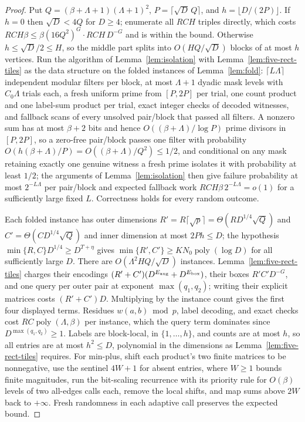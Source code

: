\documentclass[11pt]{article}
\begin{document}
\begin{proof}
Put $Q=(\beta+\Lambda+1)(\Lambda+1)^2$, $P=\lceil\sqrt D\,Q\rceil$, and
$h=\lfloor D/(2P)\rfloor$. If $h=0$ then $\sqrt D<4Q$ for $D\ge4$;
enumerate all $RCH$ triples directly, which costs
$RCH\beta\le\beta(16Q^2)^G\cdot RCH\,D^{-G}$ and is within the bound.
Otherwise $h\le\sqrt D/2\le H$, so the middle part splits into
$O(HQ/\sqrt D)$ blocks of at most $h$ vertices. Run the algorithm of
Lemma~\ref{lem:isolation} with Lemma~\ref{lem:five-rect-tiles} as the
data structure on the folded instances of Lemma~\ref{lem:fold}:
$\lceil L\Lambda\rceil$ independent modular filters per block, at most
$\Lambda+1$ dyadic mask levels with $C_0\Lambda$ trials each, a fresh
uniform prime from $[P,2P]$ per trial, one count product and one
label-sum product per trial, exact integer checks of decoded witnesses,
and fallback scans of every unsolved pair/block that passed all filters.
A nonzero sum has at most $\beta+2$ bits and hence
$O((\beta+\Lambda)/\log P)$ prime divisors in $[P,2P]$, so a zero-free
pair/block passes one filter with probability
$O(h(\beta+\Lambda)/P)=O((\beta+\Lambda)/Q^2)\le1/2$, and conditional
on any mask retaining exactly one genuine witness a fresh prime isolates
it with probability at least $1/2$; the arguments of
Lemma~\ref{lem:isolation} then give failure probability at most
$2^{-L\Lambda}$ per pair/block and expected fallback work
$RCH\beta\,2^{-L\Lambda}=o(1)$ for a sufficiently large fixed $L$.
Correctness holds for every random outcome.

Each folded instance has outer dimensions $R'=R\lceil\sqrt p\rceil
=\Theta(RD^{1/4}\sqrt Q)$ and $C'=\Theta(CD^{1/4}\sqrt Q)$ and inner
dimension at most $2Ph\le D$; the hypothesis
$\min\{R,C\}D^{1/4}\ge D^{T+\eta}$ gives
$\min\{R',C'\}\ge KN_0\operatorname{poly}(\log D)$ for all sufficiently
large $D$. There are $O(\Lambda^2HQ/\sqrt D)$ instances.
Lemma~\ref{lem:five-rect-tiles} charges their encodings
$(R'+C')(D^{E_{\rm aug}}+D^{E_{\rm box}})$, their boxes $R'C'D^{-G}$,
and one query per outer pair at exponent $\max(q_1,q_2)$; writing their
explicit matrices costs $(R'+C')D$. Multiplying by the instance count
gives the first four displayed terms. Residues $w(a,b)\bmod p$, label
decoding, and exact checks cost $RC\operatorname{poly}(\Lambda,\beta)$ per
instance, which the query term dominates since $D^{\max(q_1,q_2)}\ge1$.
Labels are block-local, in $\{1,\ldots,h\}$, and counts are at most $h$,
so all entries are at most $h^2\le D$, polynomial in the dimensions as
Lemma~\ref{lem:five-rect-tiles} requires. For min-plus, shift each product's two finite matrices to be
nonnegative, use the sentinel $4W+1$ for absent entries, where $W\ge1$
bounds finite magnitudes, run the bit-scaling recurrence with its
priority rule for $O(\beta)$ levels of two all-edges calls each, remove
the local shifts, and map sums above $2W$ back to $+\infty$. Fresh randomness in each adaptive call
preserves the expected bound.
\end{proof}
\end{document}
